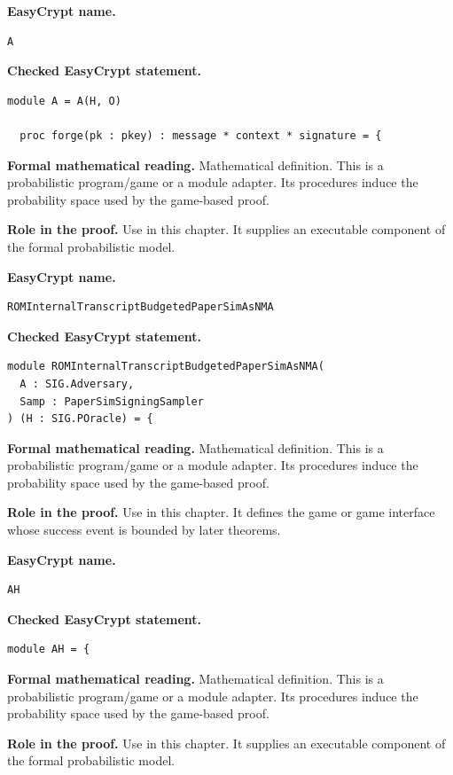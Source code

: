 \begin{formaldefinition}
\noindent\textbf{EasyCrypt name.}
\begin{lstlisting}[language=EasyCrypt,basicstyle=\ttfamily\scriptsize]
A
\end{lstlisting}
\noindent\textbf{Checked EasyCrypt statement.}
\begin{lstlisting}[language=EasyCrypt,basicstyle=\ttfamily\scriptsize]
module A = A(H, O)

  proc forge(pk : pkey) : message * context * signature = {
\end{lstlisting}
\noindent\textbf{Formal mathematical reading.}
Mathematical definition. This is a probabilistic program/game or a module adapter.  Its procedures induce the probability space used by the game-based proof.

\noindent\textbf{Role in the proof.}
Use in this chapter. It supplies an executable component of the formal probabilistic model.

\end{formaldefinition}

\begin{formaldefinition}
\noindent\textbf{EasyCrypt name.}
\begin{lstlisting}[language=EasyCrypt,basicstyle=\ttfamily\scriptsize]
ROMInternalTranscriptBudgetedPaperSimAsNMA
\end{lstlisting}
\noindent\textbf{Checked EasyCrypt statement.}
\begin{lstlisting}[language=EasyCrypt,basicstyle=\ttfamily\scriptsize]
module ROMInternalTranscriptBudgetedPaperSimAsNMA(
  A : SIG.Adversary,
  Samp : PaperSimSigningSampler
) (H : SIG.POracle) = {
\end{lstlisting}
\noindent\textbf{Formal mathematical reading.}
Mathematical definition. This is a probabilistic program/game or a module adapter.  Its procedures induce the probability space used by the game-based proof.

\noindent\textbf{Role in the proof.}
Use in this chapter. It defines the game or game interface whose success event is bounded by later theorems.

\end{formaldefinition}

\begin{formaldefinition}
\noindent\textbf{EasyCrypt name.}
\begin{lstlisting}[language=EasyCrypt,basicstyle=\ttfamily\scriptsize]
AH
\end{lstlisting}
\noindent\textbf{Checked EasyCrypt statement.}
\begin{lstlisting}[language=EasyCrypt,basicstyle=\ttfamily\scriptsize]
module AH = {
\end{lstlisting}
\noindent\textbf{Formal mathematical reading.}
Mathematical definition. This is a probabilistic program/game or a module adapter.  Its procedures induce the probability space used by the game-based proof.

\noindent\textbf{Role in the proof.}
Use in this chapter. It supplies an executable component of the formal probabilistic model.

\end{formaldefinition}

